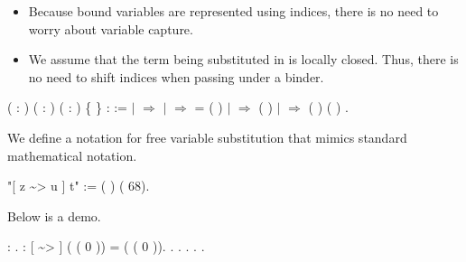 \documentclass[12pt]{report}
\begin{document}
\begin{itemize}
\item  Because bound variables are represented using indices, there
        is no need to worry about variable capture.

\item  We assume that the term being substituted in is locally
        closed.  Thus, there is no need to shift indices when
        passing under a binder.

\end{itemize}
\begin{coqdoccode}
\coqdocemptyline
\coqdocnoindent
{}  ( : ) ( : ) ( : ) \{ \} :  :=\coqdoceol
\coqdocindent{1.00em}
  \coqdoceol
\coqdocindent{1.00em}
\ensuremath{|}      \ensuremath{\Rightarrow}  \coqdoceol
\coqdocindent{1.00em}
\ensuremath{|}      \ensuremath{\Rightarrow}   =     ( )\coqdoceol
\coqdocindent{1.00em}
\ensuremath{|}      \ensuremath{\Rightarrow}  (   )\coqdoceol
\coqdocindent{1.00em}
\ensuremath{|}    \ensuremath{\Rightarrow}  (   ) (   )\coqdoceol
\coqdocindent{1.00em}
.\coqdoceol
\coqdocemptyline
\end{coqdoccode}
We define a notation for free variable substitution that mimics
    standard mathematical notation. \begin{coqdoccode}
\coqdocemptyline
\coqdocnoindent
{} "[ z \~{}> u ] t" := (   ) (  68).\coqdoceol
\coqdocemptyline
\end{coqdoccode}
Below is a demo. \begin{coqdoccode}
\coqdocemptyline
\coqdocnoindent
{}  : .\coqdoceol
\coqdocnoindent
{} :  [ \~{}> ] ( ( 0 )) = ( ( 0 )).\coqdoceol
\coqdocnoindent
{}. . . . .\coqdoceol
\coqdocemptyline
\end{coqdoccode}
\end{document}
